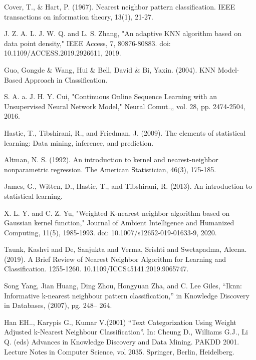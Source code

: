\documentclass[conference]{IEEEtran}
\begin{document}
%
\begin{thebibliography}{1}

Cover, T., \& Hart, P. (1967). Nearest neighbor pattern classification. IEEE transactions on information theory, 13(1), 21-27.

J. Z. A. L. J. W. Q. and L. S. Zhang, "An adaptive KNN algorithm based on data point density," IEEE Access, 7, 80876-80883. doi: 10.1109/ACCESS.2019.2926611, 2019.

Guo, Gongde \& Wang, Hui \& Bell, David \& Bi, Yaxin. (2004). KNN Model-Based Approach in Classification. 

S. A. a. J. H. Y. Cui, "Continuous Online Sequence Learning with an Unsupervised Neural Network Model," Neural Comut.,, vol. 28, pp. 2474-2504, 2016.

Hastie, T., Tibshirani, R., and Friedman, J. (2009). The elements of statistical learning: Data mining, inference, and prediction.

Altman, N. S. (1992). An introduction to kernel and nearest-neighbor nonparametric regression. The American Statistician, 46(3), 175-185.

James, G., Witten, D., Hastie, T., and Tibshirani, R. (2013). An introduction to statistical learning.





X. L. Y. and C. Z. Yu, "Weighted K-nearest neighbor algorithm based on Gaussian kernel function," Journal of Ambient Intelligence and Humanized Computing, 11(5), 1985-1993. doi: 10.1007/s12652-019-01633-9, 2020.

Taunk, Kashvi and De, Sanjukta and Verma, Srishti and Swetapadma, Aleena. (2019). A Brief Review of Nearest Neighbor Algorithm for Learning and Classification. 1255-1260. 10.1109/ICCS45141.2019.9065747. 


Song Yang, Jian Huang, Ding Zhou, Hongyuan Zha, and C. Lee Giles, “Iknn:
Informative k-nearest neighbour pattern classification,” in Knowledge Discovery in Databases, (2007), pg. 248– 264.


Han EH.., Karypis G., Kumar V.(2001) “Text Categorization Using Weight Adjusted k-Nearest Neighbour Classification”. In: Cheung D., Williams G.J., Li Q. (eds) Advances in Knowledge Discovery and Data Mining. PAKDD 2001. Lecture Notes in Computer Science, vol 2035. Springer, Berlin, Heidelberg.




\end{thebibliography}
\end{document}
